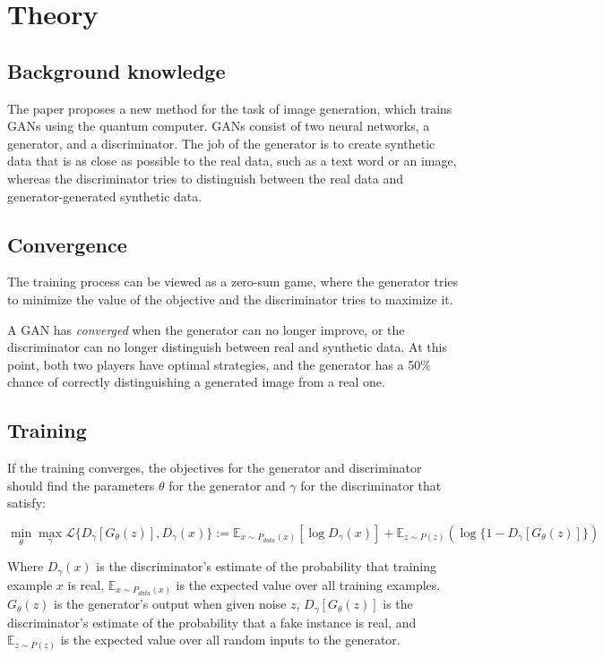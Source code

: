 \section{Theory}
\subsection{Background knowledge}
The paper proposes a new method for the task of image generation, which trains GANs using the quantum computer. GANs consist of two neural networks, a generator, and a discriminator. The job of the generator is to create synthetic data that is as close as possible to the real data, such as a text word or an image, whereas the discriminator tries to distinguish between the real data and generator-generated synthetic data. 

\subsection{Convergence}
The training process can be viewed as a zero-sum game, where the generator tries to minimize the value of the objective and the discriminator tries to maximize it. 

A GAN has \emph{converged} when the generator can no longer improve, or the discriminator can no longer distinguish between real and synthetic data. At this point, both two players have optimal strategies, and the generator has a 50\% chance of correctly distinguishing a generated image from a real one. 

\subsection{Training}

If the training converges, the objectives for the generator and discriminator should find the parameters $\theta$ for the generator and $\gamma$ for the discriminator that satisfy:

\[\min\limits_{\theta} \max\limits_{\gamma} \mathcal{L}\{D_{\gamma}{[G_{\theta}(z)], D_{\gamma}(x)}\} := \mathbb{E}_{x \sim P_{data}(x)}[\log D_{\gamma}(x)] + \mathbb{E}_{z \sim P(z)}(\log\{1 - D_{\gamma}[G_{\theta}(z)]\})\]

Where $D_{\gamma}(x)$ is the discriminator's estimate of the probability that training example $x$ is real, $\mathbb{E}_{x \sim P_{data}(x)}$ is the expected value over all training examples.
$G_{\theta}(z)$ is the generator's output when given noise $z$, $D_{\gamma}[G_{\theta}(z)]$ is the discriminator's estimate of the probability that a fake instance is real, and $\mathbb{E}_{z \sim P(z)}$ is the expected value over all random inputs to the generator. 

